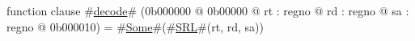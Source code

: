 function clause #\hyperref[zdecode]{decode}# (0b000000 @ 0b00000 @ rt : regno @ rd : regno @ sa : regno @ 0b000010) =
  #\hyperref[zSome]{Some}#(#\hyperref[zSRL]{SRL}#(rt, rd, sa))
